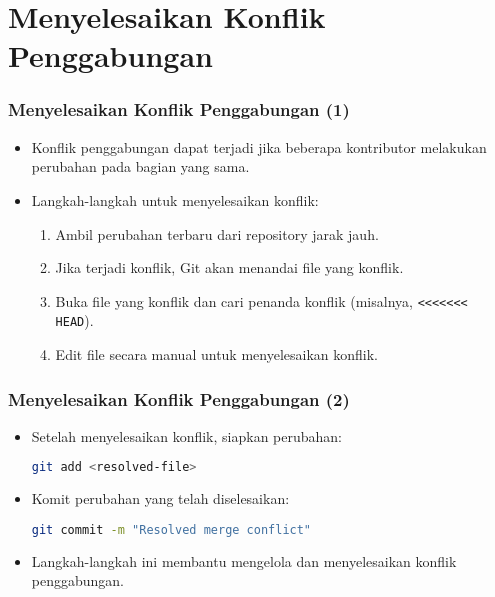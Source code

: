 \documentclass[aspectratio=169, table]{beamer}
\begin{document}
\section{Menyelesaikan Konflik Penggabungan}

\begin{frame}[fragile]
	\frametitle{Menyelesaikan Konflik Penggabungan (1)}
	\vspace{20pt}
	\begin{itemize}
		\item Konflik penggabungan dapat terjadi jika beberapa kontributor melakukan perubahan pada bagian yang sama.
		\item Langkah-langkah untuk menyelesaikan konflik:
		\begin{enumerate}
			\item Ambil perubahan terbaru dari repository jarak jauh.
			\item Jika terjadi konflik, Git akan menandai file yang konflik.
			\item Buka file yang konflik dan cari penanda konflik (misalnya, \texttt{<<<<<<< HEAD}).
			\item Edit file secara manual untuk menyelesaikan konflik.
		\end{enumerate}
	\end{itemize}
\end{frame}

\begin{frame}[fragile]
	\frametitle{Menyelesaikan Konflik Penggabungan (2)}
	\vspace{20pt}
	\begin{itemize}
		\item Setelah menyelesaikan konflik, siapkan perubahan:
		\begin{lstlisting}[language=bash]
			git add <resolved-file>
		\end{lstlisting}
		\item Komit perubahan yang telah diselesaikan:
		\begin{lstlisting}[language=bash]
			git commit -m "Resolved merge conflict"
		\end{lstlisting}
		\item Langkah-langkah ini membantu mengelola dan menyelesaikan konflik penggabungan.
	\end{itemize}
\end{frame}
\end{document}
